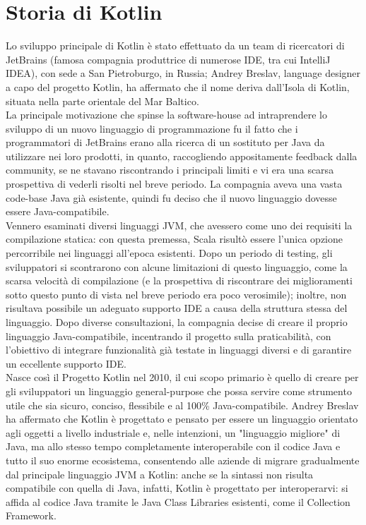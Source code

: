 \section{Storia di Kotlin}
Lo sviluppo principale di Kotlin è stato effettuato da un team di ricercatori di JetBrains (famosa compagnia produttrice di numerose IDE, tra cui IntelliJ IDEA), con sede a San Pietroburgo, in Russia; Andrey Breslav, language designer a capo del progetto Kotlin, ha affermato che il nome deriva dall’Isola di Kotlin, situata nella parte orientale del Mar Baltico.\\
La principale motivazione che spinse la software-house ad intraprendere lo sviluppo di un nuovo linguaggio di programmazione fu il fatto che i programmatori di JetBrains erano alla ricerca di un sostituto per Java da utilizzare nei loro prodotti, in quanto, raccogliendo appositamente feedback dalla community, se ne stavano riscontrando i principali limiti e vi era una scarsa prospettiva di vederli risolti nel breve periodo. La compagnia aveva una vasta code-base Java già esistente, quindi fu deciso che il nuovo linguaggio dovesse essere Java-compatibile.\\
Vennero esaminati diversi linguaggi JVM, che avessero come uno dei requisiti la compilazione statica: con questa premessa, Scala risultò essere l'unica opzione percorribile nei linguaggi all'epoca esistenti. Dopo un periodo di testing, gli sviluppatori si scontrarono con alcune limitazioni di questo linguaggio, come la scarsa velocità di compilazione (e la prospettiva di riscontrare dei miglioramenti sotto questo punto di vista nel breve periodo era poco verosimile); inoltre, non risultava possibile un adeguato supporto IDE a causa della struttura stessa del linguaggio. Dopo diverse consultazioni, la compagnia decise di creare il proprio linguaggio Java-compatibile, incentrando il progetto sulla praticabilità, con l’obiettivo di integrare funzionalità già testate in linguaggi diversi e di garantire un eccellente supporto IDE.\\

Nasce così il Progetto Kotlin nel 2010, il cui scopo primario è quello di creare per gli sviluppatori un linguaggio general-purpose che possa servire come strumento utile che sia sicuro, conciso, flessibile e al 100\% Java-compatibile. Andrey Breslav ha affermato che Kotlin è progettato e pensato per essere un linguaggio orientato agli oggetti a livello industriale e, nelle intenzioni, un "linguaggio migliore" \cite{kotlinOracle} di Java, ma allo stesso tempo completamente interoperabile con il codice Java e tutto il suo enorme ecosistema, consentendo alle aziende di migrare gradualmente dal principale linguaggio JVM a Kotlin: anche se la sintassi non risulta compatibile con quella di Java, infatti, Kotlin è progettato per interoperarvi: si affida al codice Java tramite le Java Class Libraries esistenti, come il Collection Framework. \\


